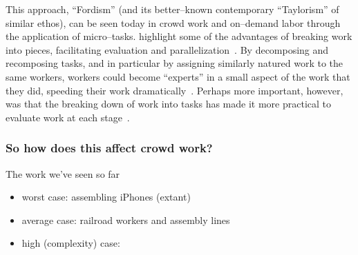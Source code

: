 \documentclass[trackingWork]{subfiles}
\begin{document}
{This approach, ``Fordism'' (and its better--known contemporary ``Taylorism'' of similar ethos),  can be seen today in crowd work and on--demand labor through the application of micro--tasks.
\citeauthor{writingMicroTasks} highlight some of the advantages of breaking work into pieces,  facilitating evaluation and parallelization~\cite{writingMicroTasks}.
By decomposing and recomposing tasks,  and in particular by assigning similarly natured work to the same workers,  workers could become ``experts'' in a small aspect of the work that they did,  speeding their work dramatically~\cite{delayAndOrderLasecki}.
Perhaps more important, however, was that
the breaking down of work into tasks has made it more practical to evaluate work at each stage~\cite{rogstadius2011assessment}.

\subsubsection{So how does this affect crowd work?}
The work we've seen so far 
\begin{itemize}
  \item worst case: assembling iPhones (extant)
  \item average case: railroad workers and assembly lines
  \item high (complexity) case: 
\end{itemize}
}
\end{document}
